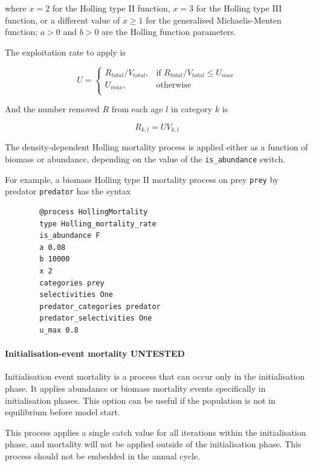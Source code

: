 where $x=2$ for the Holling type II function, $x=3$ for the Holling type III function, or a different value of $x \geq 1$ for the generalised Michaelis-Menten function; $a > 0$ and $b > 0$ are the Holling function parameters.

The exploitation rate to apply is

\begin{equation}
	U = \begin{cases}
		R_{total}/V_{total}, & \text{if $R_{total}/V_{total} \leq U_{max}$} \\
		U_{max}, & \text{otherwise}\\
	\end{cases}
\end{equation}

And the number removed $R$ from each age $l$ in category $k$ is

\begin{equation}
	R_{k,l} = U V_{k,l}
\end{equation}

The density-dependent Holling mortality process is applied either as a function of biomass or abundance, depending on the value of the \texttt{is\_abundance} switch.

For example, a biomass Holling type II mortality process on prey \texttt{prey} by predator \texttt{predator} has the syntax

{\small{\begin{verbatim}
		@process HollingMortality
		type Holling_mortality_rate
		is_abundance F
		a 0.08
		b 10000
		x 2
		categories prey
		selectivities One
		predator_categories predator
		predator_selectivities One
		u_max 0.8
		\end{verbatim}}}

\paragraph{Initialisation-event mortality UNTESTED}

Initialisation event mortality is a process that can occur only in the initialisation phase. It applies abundance or biomass mortality events specifically in initialisation phases. This option can be useful if the population is not in equilibrium before model start.

This process applies a single catch value for all iterations within the initialisation phase, and mortality will not be applied outside of the initialisation phase. This process should not be embedded in the annual cycle.

